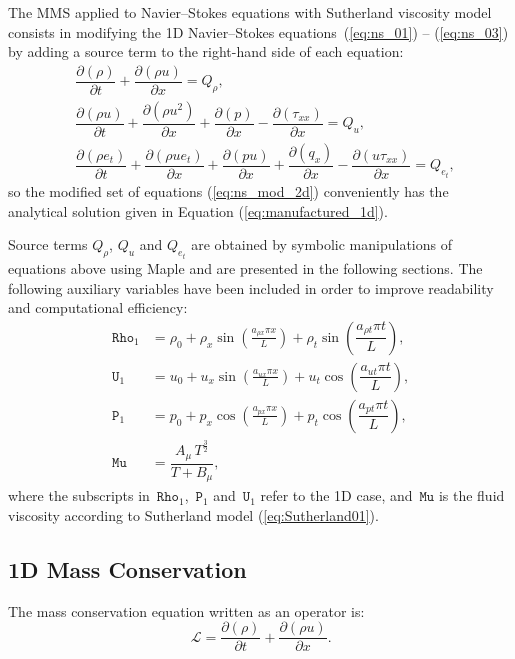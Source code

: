 \documentclass[10pt]{article}
\newcommand{\Diff}[2] {\dfrac{\partial( #1)}{\partial #2}}
\newcommand{\Rho}{\,\mathtt{Rho}}
\newcommand{\PP}{\,\mathtt{P}}
\newcommand{\U}{\,\mathtt{U}}
\newcommand{\Lo}{\,\mathcal{L}}
\newcommand{\MU}{\,\mathtt{Mu}}
\begin{document}
The MMS applied to Navier--Stokes equations with Sutherland viscosity model  consists in modifying the 1D Navier--Stokes equations~(\ref{eq:ns_01}) -- (\ref{eq:ns_03}) by adding a source term to the right-hand side of each equation:
\begin{equation}
 \label{eq:ns_mod_2d}
\begin{split}
&\Diff{\rho}{t} +\Diff{\rho u}{x} = Q_\rho,\\
&\Diff{\rho u}{t} + \Diff{\rho u^2 }{x}+ \Diff{p}{x} -\Diff{\tau_{xx}}{x}= Q_u,\\
&\Diff{\rho e_t}{t} +\Diff{\rho ue_t}{x}+ \Diff{pu}{x}+ \Diff{q_x}{x}-\Diff{u\tau_{xx}}{x} = Q_{e_t},
\end{split}
\end{equation}
%
so the modified set of equations (\ref{eq:ns_mod_2d}) conveniently has the analytical solution given in Equation (\ref{eq:manufactured_1d}).
%

Source terms $Q_\rho$, $Q_u$ and $Q_{e_t}$ are obtained by symbolic manipulations of equations above using Maple and are presented in the following sections. The following auxiliary variables have been included in order to improve readability and computational efficiency:
\begin{equation*}
 \begin{split}
\label{eq:aux_1d}
\Rho_1 &= \rho_{0}+ \rho_{x} \sin\left(\frac{a_{ \rho x} \pi x}{L}\right) + \rho_t \sin\left(\dfrac{a_{\rho t} \pi t}{L}\right),\\
\U_1 &= u_{0}+u_{x} \sin\left(\frac{a_{u x} \pi x}{L}\right) + u_t \cos\left(\dfrac{a_{u t} \pi t}{L}\right),\\
\PP_1 &= p_{0}+p_{x} \cos\left(\frac{a_{p x} \pi x}{L}\right)+ p_t \cos\left(\dfrac{a_{p t} \pi t}{L}\right),\\
\MU  &=\dfrac{A_\mu \, T^{\frac{3}{2}}}{T+B_\mu},
\end{split}
\end{equation*}
where the subscripts in $\Rho_1$, $\PP_1$ and $\U_1$ refer to the 1D case, and $\MU$ is the fluid viscosity according to Sutherland model (\ref{eq:Sutherland01}).

\subsection{1D Mass Conservation}

The mass conservation equation written as an operator is:
\begin{equation*}
 \Lo=\Diff{\rho}{t} + \Diff{\rho u}{x}.
\end{equation*}
\end{document}
